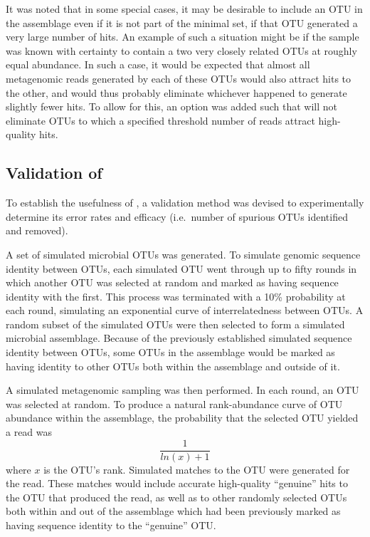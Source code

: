 It was noted that in some special cases, it may be desirable to include an \ac{OTU} in the assemblage even if it is not part of the minimal set, if that \ac{OTU} generated a very large number of  hits.
An example of such a situation might be if the sample was known with certainty to contain a two very closely related \acp{OTU} at roughly equal abundance.
In such a case, it would be expected that almost all metagenomic reads generated by each of these \acp{OTU} would also attract  hits to the other, and  would thus probably eliminate whichever happened to generate slightly fewer hits.
To allow for this, an option was added such that  will not eliminate \acp{OTU} to which a specified threshold number of reads attract high-quality hits.

\subsection{Validation of }

To establish the usefulness of , a validation method was devised to experimentally determine its error rates and efficacy (i.e.\ number of spurious \acp{OTU} identified and removed).

A set of simulated microbial \acp{OTU} was generated.
To simulate genomic sequence identity between \acp{OTU}, each simulated \ac{OTU} went through up to fifty rounds in which another \ac{OTU} was selected at random and marked as having sequence identity with the first.
This process was terminated with a 10\% probability at each round, simulating an exponential curve of interrelatedness between \acp{OTU}.
A random subset of the simulated \acp{OTU} were then selected to form a simulated microbial assemblage.
Because of the previously established simulated sequence identity between \acp{OTU}, some \acp{OTU} in the assemblage would be marked as having identity to other \acp{OTU} both within the assemblage and outside of it.

A simulated metagenomic sampling was then performed.
In each round, an \ac{OTU} was selected at random.
To produce a natural rank-abundance curve of \ac{OTU} abundance within the assemblage, the probability that the selected \ac{OTU} yielded a read was
\begin{equation*}
\frac{1}{ln(x)+1}
\end{equation*}
where $x$ is the \ac{OTU}'s rank.
Simulated  matches to the \ac{OTU} were generated for the read.
These matches would include accurate high-quality ``genuine'' hits to the \ac{OTU} that produced the read, as well as to other randomly selected \acp{OTU} both within and out of the assemblage which had been previously marked as having sequence identity to the ``genuine'' \ac{OTU}.

